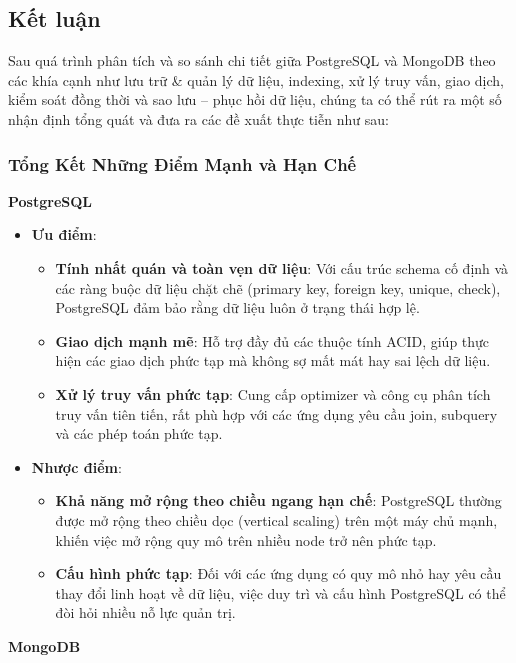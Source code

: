 \subsection{Kết luận}

Sau quá trình phân tích và so sánh chi tiết giữa PostgreSQL và MongoDB theo các khía cạnh như lưu trữ \& quản lý dữ liệu, indexing, xử lý truy vấn, giao dịch, kiểm soát đồng thời và sao lưu – phục hồi dữ liệu, chúng ta có thể rút ra một số nhận định tổng quát và đưa ra các đề xuất thực tiễn như sau:

\subsubsection{Tổng Kết Những Điểm Mạnh và Hạn Chế}

\textbf{PostgreSQL}

\begin{itemize}
    \item \textbf{Ưu điểm}:
    \begin{itemize}
        \item \textbf{Tính nhất quán và toàn vẹn dữ liệu}: Với cấu trúc schema cố định và các ràng buộc dữ liệu chặt chẽ (primary key, foreign key, unique, check), PostgreSQL đảm bảo rằng dữ liệu luôn ở trạng thái hợp lệ.
        \item \textbf{Giao dịch mạnh mẽ}: Hỗ trợ đầy đủ các thuộc tính ACID, giúp thực hiện các giao dịch phức tạp mà không sợ mất mát hay sai lệch dữ liệu.
        \item \textbf{Xử lý truy vấn phức tạp}: Cung cấp optimizer và công cụ phân tích truy vấn tiên tiến, rất phù hợp với các ứng dụng yêu cầu join, subquery và các phép toán phức tạp.
    \end{itemize}
    \item \textbf{Nhược điểm}:
    \begin{itemize}
        \item \textbf{Khả năng mở rộng theo chiều ngang hạn chế}: PostgreSQL thường được mở rộng theo chiều dọc (vertical scaling) trên một máy chủ mạnh, khiến việc mở rộng quy mô trên nhiều node trở nên phức tạp.
        \item \textbf{Cấu hình phức tạp}: Đối với các ứng dụng có quy mô nhỏ hay yêu cầu thay đổi linh hoạt về dữ liệu, việc duy trì và cấu hình PostgreSQL có thể đòi hỏi nhiều nỗ lực quản trị.
    \end{itemize}
\end{itemize}

\noindent
\textbf{MongoDB}

